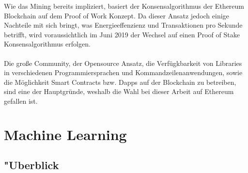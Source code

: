 Wie das Mining bereits impliziert, basiert der Konsensalgorithmus der Ethereum Blockchain auf dem Proof of Work Konzept. Da dieser Ansatz jedoch einige Nachteile mit sich bringt, was Energieeffenzienz und Transaktionen pro Sekunde betrifft, wird voraussichtlich im Juni 2019 der Wechsel auf einen Proof of Stake Konsensalgorithmus erfolgen. \\\\
Die große Community, der Opensource Ansatz, die Verfügkbarkeit von Libraries in verschiedenen Programmiersprachen und Kommandzeilenanwendungen, sowie die Möglichkeit Smart Contracts bzw. Dapps auf der Blockchain zu betreiben, sind eine der Hauptgründe, weshalb die Wahl bei dieser Arbeit auf Ethereum gefallen ist.   
\cite{BitcoinEthNCo,DL:bafin,Antonopoulos:2017:MBP:3164842}


\section{Machine Learning}
\subsection{"Uberblick}

